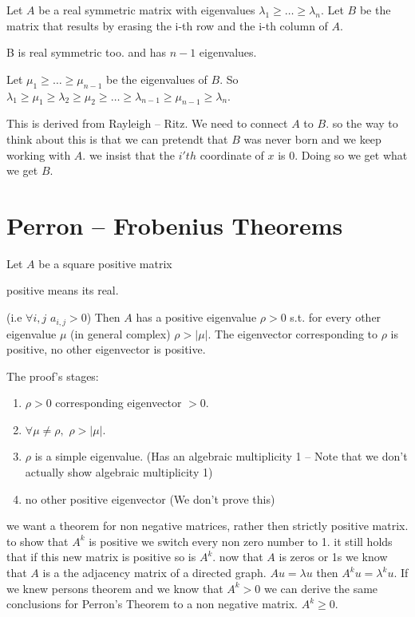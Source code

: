 \begin{thm}
Let $A$ be a real symmetric matrix with eigenvalues $\lambda_{1}\ge\dots\ge\lambda_{n}$.
Let $B$ be the matrix that results by erasing the i-th row and the
i-th column of $A$. %
\begin{insight}
B is real symmetric too. and has $n-1$ eigenvalues.%
\end{insight}
{} Let $\mu_{1}\ge\dots\ge\mu_{n-1}$ be the eigenvalues of $B$. So
$\lambda_{1}\ge\mu_{1}\ge\lambda_{2}\ge\mu_{2}\ge\dots\ge\lambda_{n-1}\ge\mu_{n-1}\ge\lambda_{n}$.
\begin{insight}
This is derived from Rayleigh -- Ritz. We need to connect $A$ to
$B$. so the way to think about this is that we can pretendt that
$B$ was never born and we keep working with $A$. we insist that
the $i'th$ coordinate of $x$ is 0. Doing so we get what we get $B$.%
\end{insight}
\end{thm}


\section{Perron -- Frobenius Theorems}
\begin{thm}[Perron]
 Let $A$ be a square positive matrix %
\begin{insight}
positive means its real.%
\end{insight}
(i.e $\forall i,j$ $a_{i,j}>0$) Then $A$ has a positive eigenvalue
$\rho>0$ s.t. for every other eigenvalue $\mu$ (in general complex)
$\rho>\left|\mu\right|$. The eigenvector corresponding to $\rho$
is positive, no other eigenvector is positive.
\end{thm}

The proof's stages:
\begin{enumerate}
\item $\rho>0$ corresponding eigenvector $>0$.
\item $\forall\mu\ne\rho,\,\,\rho>\left|\mu\right|$.
\item $\rho$ is a simple eigenvalue. (Has an algebraic multiplicity 1 --
Note that we don't actually show algebraic multiplicity 1) 
\item no other positive eigenvector (We don't prove this)
\end{enumerate}
\begin{insight}
we want a theorem for non negative matrices, rather then strictly
positive matrix. to show that $A^{k}$ is positive we switch every
non zero number to 1. it still holds that if this new matrix is positive
so is $A^{k}$. now that $A$ is zeros or 1s we know that $A$ is
a the adjacency matrix of a directed graph. $Au=\lambda u$ then $A^{k}u=\lambda^{k}u$.
If we knew persons theorem and we know that $A^{k}>0$ we can derive
the same conclusions for Perron's Theorem to a non negative matrix.
$A^{k}\ge0$.%
\end{insight}

